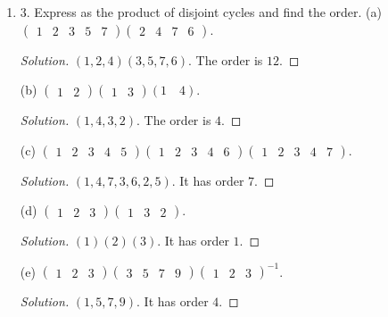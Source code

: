 \begin{enumerate}[resume]
	\item 3. Express as the product of disjoint cycles and find the order.
(a) $\left(\begin{array}{lllll}1 & 2 & 3 & 5 & 7\end{array}\right)\left(\begin{array}{llll}2 & 4 & 7 & 6\end{array}\right)$.
\begin{proof}[Solution]
	$(1,2,4)(3,5,7,6)$. The order is  $12$.
\end{proof}

(b) $\left(\begin{array}{lll}1 & 2\end{array}\right)\left(\begin{array}{lll}1 & 3\end{array}\right)(1 \quad 4)$.
\begin{proof}[Solution]
	$(1,4,3,2)$. The order is $4$.
\end{proof}

(c) $\left(\begin{array}{lllllllll}1 & 2 & 3 & 4 & 5\end{array}\right)\left(\begin{array}{lllllll}1 & 2 & 3 & 4 & 6\end{array}\right)\left(\begin{array}{lllll}1 & 2 & 3 & 4 & 7\end{array}\right)$.
\begin{proof}[Solution]
	$(1,4,7,3,6,2,5)$. It has order $7$.
\end{proof}

(d) $\left(\begin{array}{lll}1 & 2 & 3\end{array}\right)\left(\begin{array}{lll}1 & 3 & 2\end{array}\right)$.
\begin{proof}[Solution]
	$(1)(2)(3)$. It has order $1$.
\end{proof}

(e) $\left(\begin{array}{lllll}1 & 2 & 3\end{array}\right)\left(\begin{array}{llll}3 & 5 & 7 & 9\end{array}\right)\left(\begin{array}{lll}1 & 2 & 3\end{array}\right)^{-1}$.
\begin{proof}[Solution]
	$(1,5,7,9)$. It has order $4$.
\end{proof}


\end{enumerate}
